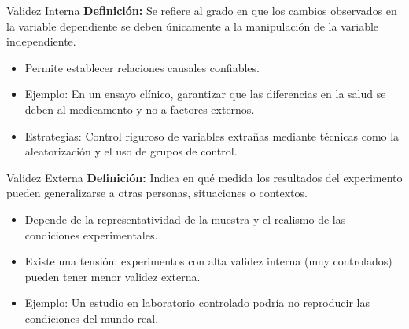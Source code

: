 ﻿\documentclass{beamer}
\begin{document}
\begin{frame}{Validez Interna}
\textbf{Definición:} Se refiere al grado en que los cambios observados en la variable dependiente se deben únicamente a la manipulación de la variable independiente.
\begin{itemize}
    \item Permite establecer relaciones causales confiables.
    \item Ejemplo: En un ensayo clínico, garantizar que las diferencias en la salud se deben al medicamento y no a factores externos.
    \item Estrategias: Control riguroso de variables extrañas mediante técnicas como la aleatorización y el uso de grupos de control.
\end{itemize}
\end{frame}

\begin{frame}{Validez Externa}
\textbf{Definición:} Indica en qué medida los resultados del experimento pueden generalizarse a otras personas, situaciones o contextos.
\begin{itemize}
    \item Depende de la representatividad de la muestra y el realismo de las condiciones experimentales.
    \item Existe una tensión: experimentos con alta validez interna (muy controlados) pueden tener menor validez externa.
    \item Ejemplo: Un estudio en laboratorio controlado podría no reproducir las condiciones del mundo real.
\end{itemize}
\end{frame}
\end{document}
